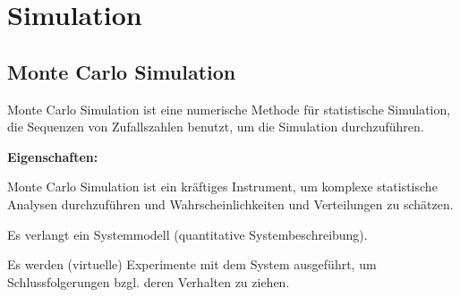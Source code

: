 \section{Simulation}
\subsection{Monte Carlo Simulation}
Monte Carlo Simulation ist eine numerische Methode für statistische Simulation, die Sequenzen von Zufallszahlen benutzt, um die Simulation durchzuführen.

\textbf{Eigenschaften:}
\begin{compactitem}
	\item Monte Carlo Simulation ist ein kräftiges Instrument, um komplexe statistische Analysen durchzuführen und Wahrscheinlichkeiten und Verteilungen zu schätzen.
	\item Es verlangt ein Systemmodell (quantitative Systembeschreibung).
	\item Es werden (virtuelle) Experimente mit dem System ausgeführt, um Schlussfolgerungen bzgl. deren Verhalten zu ziehen.
\end{compactitem}


